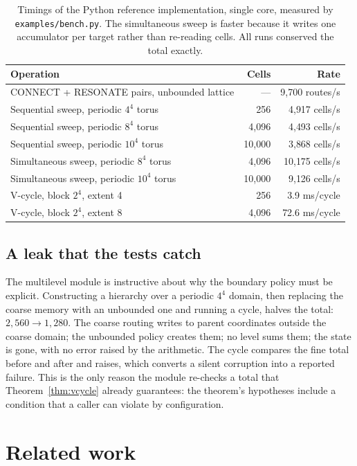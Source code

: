 \documentclass[11pt,a4paper]{article}
\theoremstyle{definition}
\begin{document}
\begin{table}[h]
\centering
\small
\begin{tabular}{@{}lrr@{}}
\toprule
Operation & Cells & Rate \\
\midrule
CONNECT + RESONATE pairs, unbounded lattice & --- & 9{,}700 routes/s \\
Sequential sweep, periodic $4^4$ torus & 256 & 4{,}917 cells/s \\
Sequential sweep, periodic $8^4$ torus & 4{,}096 & 4{,}493 cells/s \\
Sequential sweep, periodic $10^4$ torus & 10{,}000 & 3{,}868 cells/s \\
Simultaneous sweep, periodic $8^4$ torus & 4{,}096 & 10{,}175 cells/s \\
Simultaneous sweep, periodic $10^4$ torus & 10{,}000 & 9{,}126 cells/s \\
V-cycle, block $2^4$, extent 4 & 256 & 3.9 ms/cycle \\
V-cycle, block $2^4$, extent 8 & 4{,}096 & 72.6 ms/cycle \\
\bottomrule
\end{tabular}
\caption{Timings of the Python reference implementation, single core,
measured by \texttt{examples/bench.py}. The simultaneous sweep is faster
because it writes one accumulator per target rather than re-reading cells.
All runs conserved the total exactly.}
\label{tab:timing}
\end{table}

\subsection{A leak that the tests catch}

The multilevel module is instructive about why the boundary policy must be
explicit. Constructing a hierarchy over a periodic $4^4$ domain, then replacing
the coarse memory with an unbounded one and running a cycle, halves the total:
$2{,}560 \to 1{,}280$. The coarse routing writes to parent coordinates outside
the coarse domain; the unbounded policy creates them; no level sums them; the
state is gone, with no error raised by the arithmetic. The cycle compares the
fine total before and after and raises, which converts a silent corruption into
a reported failure. This is the only reason the module re-checks a total that
Theorem~\ref{thm:vcycle} already guarantees: the theorem's hypotheses include a
condition that a caller can violate by configuration.

\section{Related work}\label{sec:related}
\end{document}
